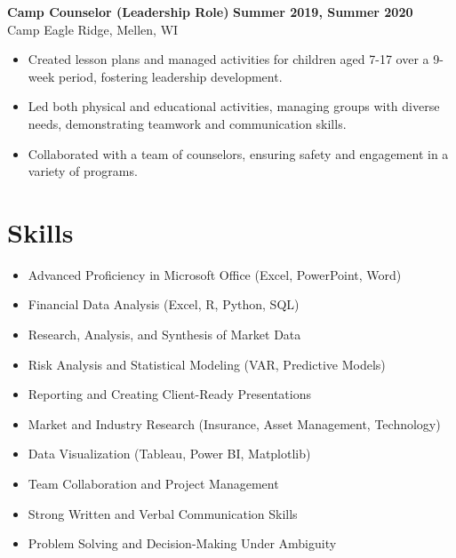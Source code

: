 \documentclass[10pt]{article}
\begin{document}
\vspace{0pt}
\textbf{Camp Counselor (Leadership Role)} \hfill \textbf{Summer 2019, Summer 2020} \\
Camp Eagle Ridge, Mellen, WI
\begin{itemize}[noitemsep,nosep]
    \item Created lesson plans and managed activities for children aged 7-17 over a 9-week period, fostering leadership development.
    \item Led both physical and educational activities, managing groups with diverse needs, demonstrating teamwork and communication skills.
    \item Collaborated with a team of counselors, ensuring safety and engagement in a variety of programs.
\end{itemize}

\vspace{-10pt}
\section*{Skills}
\vspace{0pt}
\begin{multicols}{2}
\begin{itemize}[noitemsep,nosep]
    \item Advanced Proficiency in Microsoft Office (Excel, PowerPoint, Word)
    \item Financial Data Analysis (Excel, R, Python, SQL)
    \item Research, Analysis, and Synthesis of Market Data
    \item Risk Analysis and Statistical Modeling (VAR, Predictive Models)
    \item Reporting and Creating Client-Ready Presentations
    \item Market and Industry Research (Insurance, Asset Management, Technology)
    \item Data Visualization (Tableau, Power BI, Matplotlib)
    \item Team Collaboration and Project Management
    \item Strong Written and Verbal Communication Skills
    \item Problem Solving and Decision-Making Under Ambiguity
\end{itemize}
\end{multicols}
\end{document}
